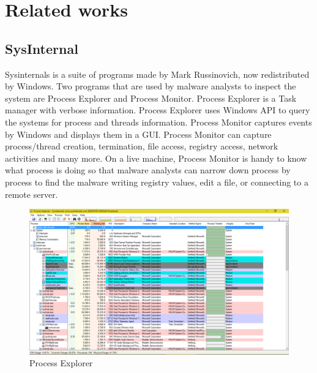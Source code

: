 \chapter[Related Works]{Related works}




\section[SysInternal]{SysInternal}

Sysinternals \cite{sysinternal} is a suite of programs made by Mark
Russinovich, now redistributed by Windows. Two programs that are used by
malware analysts to inspect the system are Process Explorer and Process
Monitor.  Process Explorer is a Task manager with verbose information. Process
Explorer uses Windows API to query the systems for process and threads
information.  Process Monitor captures events by Windows and displays them in a
GUI. Process Monitor can capture process/thread creation, termination, file
access, registry access, network activities and many more. On a live machine,
Process Monitor is handy to know what process is doing so that malware analysts
can narrow down process by process to find the malware writing registry values,
edit a file, or connecting to a remote server.


\begin{figure}[h]
  \centering
  \caption{Process Explorer}
  \label{fig:processexp}
  \includegraphics[scale=0.4]{images/processexp.png}
\end{figure}

